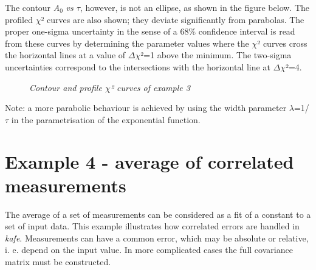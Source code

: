 \documentclass[a4paper,10pt,english]{sphinxmanual}
\begin{document}
The contour \emph{A}$_{\text{0}}$ \emph{vs \(\tau\)}, however, is not an ellipse,
as shown in the figure below. The profiled \(\chi\)² curves are
also shown; they deviate significantly from parabolas.
The proper one-sigma uncertainty in the sense of a 68\%
confidence interval is read from these curves by determining
the parameter values where the \(\chi\)² curves cross the horizontal
lines at a value of \(\Delta\)\(\chi\)²=1 above the minimum. The two-sigma
uncertainties correspond to the intersections with the
horizontal line at \(\Delta\)\(\chi\)²=4.
\begin{figure}[htbp]
\centering
\capstart

\caption{\emph{Contour and profile \(\chi\)² curves of example 3}}\end{figure}

Note: a more parabolic behaviour is achieved
by using the width parameter \(\lambda\)=1/\(\tau\) in the
parametrisation of the exponential function.


\section{Example 4 - average of correlated measurements}
\label{examples:example-4-average-of-correlated-measurements}
The average of a set of measurements can be considered as a fit
of a constant to a set of input data. This example illustrates
how correlated errors are handled in \emph{kafe}.
Measurements can have a common error, which may be absolute
or relative, i. e. depend on the input value.  In more complicated
cases the full covariance matrix must be constructed.
\end{document}

